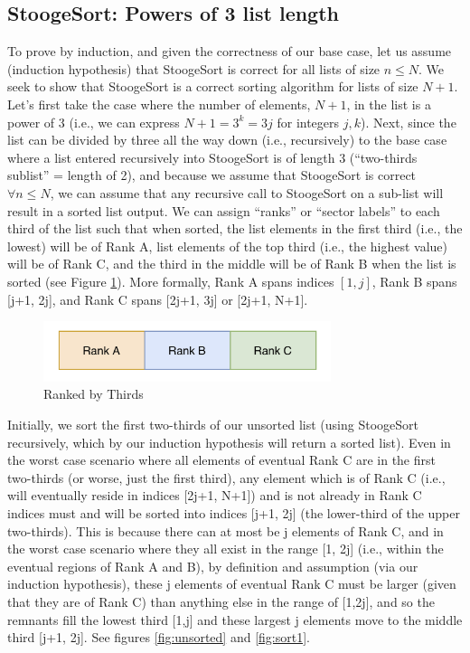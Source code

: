 \documentclass[conference]{styles/acmsiggraph}
\newcommand{\?}{\stackrel{?}{=}}
\begin{document}
\subsection{StoogeSort: Powers of 3 list length}

To prove by induction, and given the correctness of our base case, let us assume (induction hypothesis) that StoogeSort is correct for all lists of size $n \leq N$.  We seek to show that StoogeSort is a correct sorting algorithm for lists of size $N+1$. Let's first take the case where the number of elements, $N+1$,  in the list is a power of 3 (i.e., we can express $N+1 = 3^k = 3j$ for integers $j, k$).  Next, since the list can be divided by three all the way down (i.e., recursively) to the base case where a list entered recursively into StoogeSort is of length 3 (\enquote{two-thirds sublist} = length of 2), and because we assume that StoogeSort is correct $\forall n \leq N$, we can assume that any recursive call to StoogeSort on a sub-list will result in a sorted list output.  We can assign \enquote{ranks} or \enquote{sector labels} to each third of the list such that when sorted, the list elements in the first third (i.e., the lowest) will be of Rank A, list elements of the top third (i.e., the highest value) will be of Rank C, and the third in the middle will be of Rank B when the list is sorted (see Figure \ref{fig:ranks}).  More formally, Rank A spans indices $[1, j]$, Rank B spans [j+1, 2j], and Rank C spans [2j+1, 3j] or [2j+1, N+1].

\begin{figure}[h]
    \centering
    \includegraphics[width=0.75\textwidth]{StoogeFigures/Rank.png}
    \caption{Ranked by Thirds}
    \label{fig:ranks}
\end{figure}
\FloatBarrier

Initially, we sort the first two-thirds of our unsorted list (using StoogeSort recursively, which by our induction hypothesis will return a sorted list).  Even in the worst case scenario where all elements of eventual Rank C are in the first two-thirds (or worse, just the first third), any element which is of Rank C (i.e., will eventually reside in indices [2j+1, N+1]) and is not already in Rank C indices must and will be sorted into indices [j+1, 2j] (the lower-third of the upper two-thirds).  This is because there can at most be j elements of Rank C, and in the worst case scenario where they all exist in the range [1, 2j] (i.e., within the eventual regions of Rank A and B), by definition and assumption (via our induction hypothesis), these j elements of eventual Rank C must be larger (given that they are of Rank C) than anything else in the range of [1,2j], and so the remnants fill the lowest third [1,j] and these largest j elements move to the middle third [j+1, 2j].  See figures \ref{fig:unsorted} and \ref{fig:sort1}.
\end{document}
